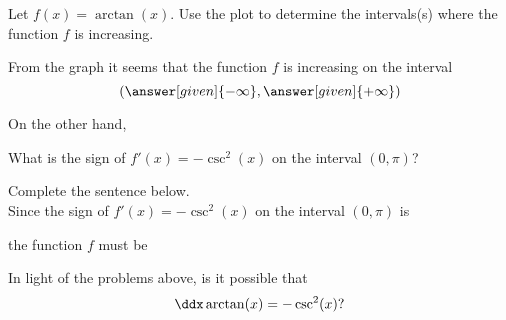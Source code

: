 \documentclass{ximera}
\begin{document}
\begin{problem}
\author{Nela Lakos}
  Let $f(x) = \arctan(x)$. Use the plot  to determine the  intervals(s) where the function $f$ is increasing.
  
From the graph it seems that the function $f$ is increasing on the interval
  \[
 (\answer[given]{-\infty},\answer[given]{+\infty})
  \]
\end{problem}




On the other hand,

\begin{problem}
 What is the sign of $f'(x)= - \csc^2 (x)$ on the interval $(0,\pi)$?
 \begin{multipleChoice}
\end{multipleChoice}
\end{problem}


\begin{problem}
Complete the sentence below.\\

 Since the sign of $f'(x)= - \csc^2 (x)$ on the interval $(0,\pi)$ is
 \begin{multipleChoice}
\end{multipleChoice}
the function $f$ must be
\begin{multipleChoice}
\end{multipleChoice}
\end{problem}

\begin{problem}

In light of the problems above, is it possible that
\[
\ddx \arctan(x) = -\csc^2(x)?
\]
\begin{multipleChoice}
\end{multipleChoice}
\end{problem}
\end{document}
